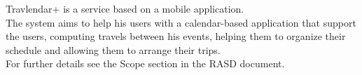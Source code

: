 Travlendar+ is a service based on a mobile application.\\
The system aims to help his users with a calendar-based application that support the users, computing travels between his events, helping them to organize their schedule and allowing them to arrange their trips. \\ 
For further details see the Scope section in the RASD document.